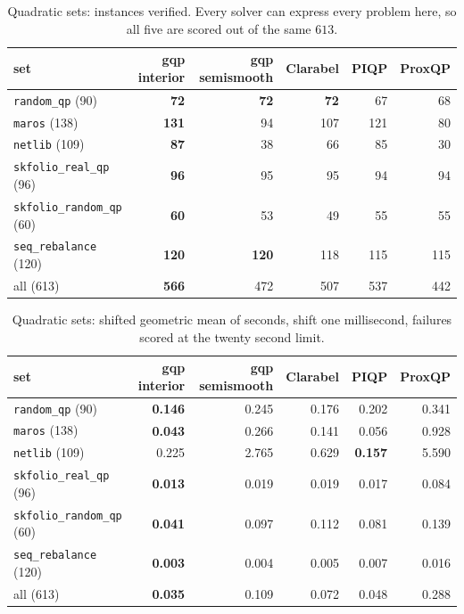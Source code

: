 \documentclass[a4paper,11pt]{book}
\theoremstyle{plain}
\theoremstyle{definition}
\theoremstyle{remark}
\numberwithin{equation}{chapter}
\numberwithin{algorithm}{chapter}
\begin{document}
	\begin{table}[H]
		\centering\small
		\begin{tabular}{lrrrrr}
			\toprule
			set & gqp interior & gqp semismooth & Clarabel & PIQP & ProxQP\\
			\midrule
			\texttt{random\_qp} (90)             & \textbf{72} & \textbf{72} & \textbf{72} & 67 & 68\\
			\texttt{maros} (138)                 & \textbf{131} & 94 & 107 & 121 & 80\\
			\texttt{netlib} (109)                & \textbf{87} & 38 & 66 & 85 & 30\\
			\texttt{skfolio\_real\_qp} (96)      & \textbf{96} & 95 & 95 & 94 & 94\\
			\texttt{skfolio\_random\_qp} (60)    & \textbf{60} & 53 & 49 & 55 & 55\\
			\texttt{seq\_rebalance} (120)        & \textbf{120} & \textbf{120} & 118 & 115 & 115\\
			\midrule
			all (613)                            & \textbf{566} & 472 & 507 & 537 & 442\\
			\bottomrule
		\end{tabular}
		\caption{Quadratic sets: instances verified. Every solver can express every
			problem here, so all five are scored out of the same $613$.}
	\end{table}

	\begin{table}[H]
		\centering\small
		\begin{tabular}{lrrrrr}
			\toprule
			set & gqp interior & gqp semismooth & Clarabel & PIQP & ProxQP\\
			\midrule
			\texttt{random\_qp} (90)             & \textbf{0.146} & 0.245 & 0.176 & 0.202 & 0.341\\
			\texttt{maros} (138)                 & \textbf{0.043} & 0.266 & 0.141 & 0.056 & 0.928\\
			\texttt{netlib} (109)                & 0.225 & 2.765 & 0.629 & \textbf{0.157} & 5.590\\
			\texttt{skfolio\_real\_qp} (96)      & \textbf{0.013} & 0.019 & 0.019 & 0.017 & 0.084\\
			\texttt{skfolio\_random\_qp} (60)    & \textbf{0.041} & 0.097 & 0.112 & 0.081 & 0.139\\
			\texttt{seq\_rebalance} (120)        & \textbf{0.003} & 0.004 & 0.005 & 0.007 & 0.016\\
			\midrule
			all (613)                            & \textbf{0.035} & 0.109 & 0.072 & 0.048 & 0.288\\
			\bottomrule
		\end{tabular}
		\caption{Quadratic sets: shifted geometric mean of seconds, shift one
			millisecond, failures scored at the twenty second limit.}
	\end{table}
\end{document}
